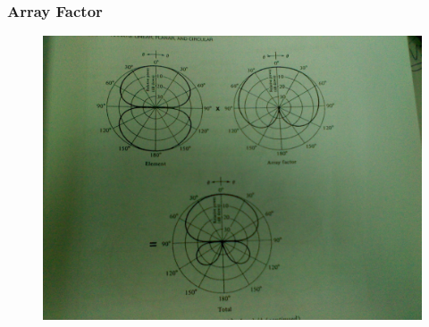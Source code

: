 \documentclass[compress=true]{beamer}
\begin{document}
\begin{frame}
  \frametitle{Array Factor}
   \begin{figure}
    \includegraphics[height=0.8\textheight]{af.jpg}
  \end{figure}

\end{frame}
 
\end{document}
